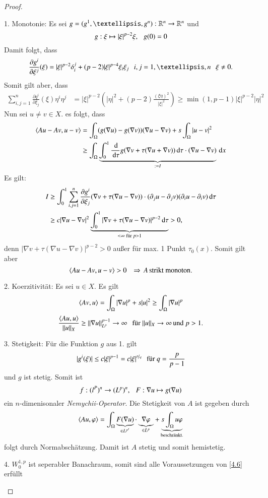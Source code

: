 \begin{proof}
    \begin{description}
    \item{1. Monotonie:}
    Es sei $g=(g^1,…,g^n):\R^n\ra \R^n$ und
    \[
        g:\xi \mapsto |\xi|^{p-2} \xi, \hspace{.25cm} g(0)=0  
    \]
    Damit folgt, dass
    \[
        \frac{\partial g^i}{\partial \xi^j}(\xi)=|\xi|^{p-2} \delta_i^j + (p-2)|\xi|^{p-4}\xi_i\xi_j
        \qq i,j=1,…,n \qq \xi\neq 0.
    \]
    Somit gilt aber, dass
    \begin{align*}
        \sum_{i,j=1}^n \frac{\partial q^i}{\partial \xi _j}(\xi) \eta^i\eta^j&= |\xi|^{p-2}
        \left( |\eta|^2+ (p-2)\frac{(\xi \eta)^2}{|\xi|^2} \right)
        \geq \min(1,p-1) |\xi|^{p-2} |\eta|^2
    \end{align*}
    Nun sei $u\neq v \in X.$ es folgt, dass
    \begin{align*}
        \langle Au-Av,u-v\rangle &= \int_\Omega (g(\nabla u)- g(\nabla v))(\nabla u - \nabla v) + s \int_\Omega
        |u-v|^2\\
            &\geq \int_\Omega \underbrace{\int_0^1 \frac{\, \mathrm{d}}{\, \mathrm{d} \tau} g(\nabla v + \tau(\nabla u +
                        \nabla v)) \, \mathrm{d}\tau\cdot(\nabla u-\nabla v)}_{:= I}  \, \mathrm{d} x\\
    \end{align*}
    Es gilt:
    \begin{align*}
        I&\geq \int_0^1 \sum_{i,j=1}^n\frac{\partial g^i}{\partial\xi_j}(\nabla v + \tau(\nabla u-\nabla v))
        \cdot (\partial_ju-\partial_jv)(\partial_iu-\partial_iv)\, \mathrm{d} \tau\\
        &\geq  c |\nabla u - \nabla v|^2\underbrace{\int_0^1 |\nabla v+\tau(\nabla u -\nabla v)|^{p-2}\, \mathrm{d}\tau}
        _{<\infty \text{ für }p>1} >0,
    \end{align*}
    denn $|\nabla v + \tau (\nabla u - \nabla v)|^{p-2}>0$ außer für max. 1 Punkt $\tau_0(x)$. Somit gilt
    aber
    \[
        \langle Au-Av, u-v \rangle >0 \hspace{.25cm} \Rightarrow \, A \, \text{strikt monoton.}
    \]
    \item{2. Koerzitivität:}
    Es sei $u\in X$. Es gilt
    \[
        \langle Av,u\rangle= \int_\Omega |\nabla u|^p + s|u|^2\geq \int_\Omega |\nabla u|^p
    \]
    \[
        \frac{\langle Au,u \rangle}{\|u\|_X} \geq \|\nabla u\|^{p-1}_{L^p} \rightarrow \infty \hspace{.25cm} \text{für }\|u\|_X
        \rightarrow \infty \, \text{und } p>1.
    \]
    \item{3. Stetigkeit:}
    Für die Funktion $g$ aus 1. gilt
    \[
        |g^i(\xi)|\leq c |\xi|^{p-1} = c |\xi|^{\nicefrac pq} \hspace{.25cm} \text{für } q=\frac{p}{p-1}
    \]
    und $g$ ist stetig. Somit ist 
    \[
        f:(l^P)^n\rightarrow (L^p)^n, \hspace{.25cm}  F:\nabla u \mapsto g(\nabla u)
    \]
    ein $n$-dimenisonaler \textit{Nemychii-Operator}. Die Stetigkeit von $A$ ist gegeben durch
    \[
        \langle Au,\varphi\rangle=\int_\Omega \underbrace{F(\nabla u)}_{\in L^{p'}} \cdot \underbrace{\nabla \varphi}
        _{\in L^p} +\underbrace{s\int_\Omega u \varphi}_{\text{beschränkt.}}
    \]
    folgt durch Normabschätzung. Damit ist $A$ stetig und somit hemistetig.
    \item{4.}
    $W_0^{1,p}$ ist seperabler Banachraum, somit sind alle Voraussetzungen von \ref{4.6} erfüllt
    \end{description}
    \[ \]
\end{proof}
